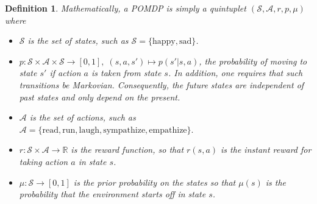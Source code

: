 \documentclass[10pt,letterpaper]{article}
\newtheorem*{definition*}{Definition}
\newtheorem{remark}{Remark}
\begin{document}
\begin{mdframed}
\begin{definition*}
Mathematically, a POMDP is simply a quintuplet $(\mathcal S, \mathcal A, r, p, \mu)$ where
\begin{itemize}
\item $\mathcal S$ is the set of states, such as $\mathcal S = \{\text{happy}, \text{sad}\}$.
\item $p : \mathcal S \times \mathcal A \times \mathcal S \rightarrow [0, 1],\; (s,a,s') \mapsto p(s'|s,a)$,
  the probability of moving to state $s'$ if action $a$ is taken from state $s$. In addition, one requires that such
  transitions be Markovian. Consequently, the future states are independent of past states and only depend on the present.
\item $\mathcal A$ is the set of actions, such as $\mathcal A = \{\text{read}, \text{run},
  \text{laugh}, \text{sympathize}, \text{empathize}\}.$
\item $r : \mathcal S \times \mathcal A \rightarrow \mathbb R$ is the \textit{reward function},
  so that $r(s, a)$ is the instant reward for taking action $a$ in state $s$.
\item $\mu: \mathcal S \rightarrow [0, 1]$ is the prior probability on the states so that
  $\mu(s)$ is the probability that the environment starts off in state $s$.
\end{itemize}

\end{definition*}
\end{mdframed}
\end{document}
